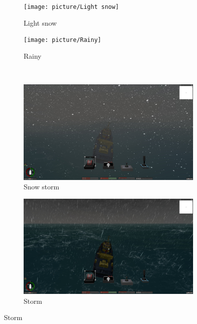 \documentclass[letterpaper,10pt]{article}
\begin{document}
\begin{figure}[ht]
\begin{subfigure}{0.3\textwidth}
					\end{subfigure}
					\begin{subfigure}{0.3\textwidth}
						\texttt{[image: picture/Light snow]}
						\captionsetup{font=scriptsize}
						\caption{Light snow}
						\label{fig: Light snow}
					\end{subfigure}
					\begin{subfigure}{0.3\textwidth}
						\texttt{[image: picture/Rainy]}
						\captionsetup{font=scriptsize}
						\caption{Rainy}
						\label{fig: Rainy}
					\end{subfigure}\\
					\begin{subfigure}{0.3\textwidth}
						\includegraphics[width=\linewidth]{picture/Snow storm}
						\captionsetup{font=scriptsize}
						\caption{Snow storm}
						\label{fig: Snow storm}	
					\end{subfigure}
					\begin{subfigure}{0.3\textwidth}
						\includegraphics[width=\linewidth]{picture/Storm}
						\captionsetup{font=scriptsize}
						\caption{Storm}
						\label{fig: Storm}	
					\end{subfigure}

\end{figure}
\end{document}
